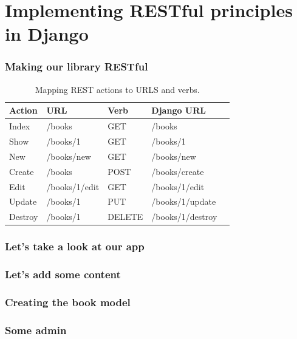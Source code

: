 \documentclass[10pt,t,xcolor=dvipsnames]{beamer}
\begin{document}
\section{Implementing RESTful principles in Django}
\begin{frame}[fragile]
\frametitle{Making our library RESTful}
\pause
\begin{table}
\scriptsize
\centering
\begin{tabular}{|l|l|l|l|l|}\hline
Action  &URL&  Verb & Django URL\\ \hline\hline
Index&/books&GET & /books\\
Show&/books/1&GET & /books/1\\
New&/books/new&GET & /books/new\\
Create&/books&POST & /books/create \\
Edit&/books/1/edit&GET & /books/1/edit\\
Update&/books/1&PUT & /books/1/update\\
Destroy&/books/1&DELETE & /books/1/destroy\\ \hline
\end{tabular}
\caption{\footnotesize Mapping REST actions to URLS and verbs.}
\end{table}

\end{frame}
\begin{frame}[fragile]
\frametitle{Let's take a look at our app}

\end{frame}
\begin{frame}[fragile]
\frametitle{Let's add some content}

\end{frame}
\begin{frame}[fragile]
\frametitle{Creating the book model}

\end{frame}
\begin{frame}[fragile]
\frametitle{Some admin}

\end{frame}
\end{document}
